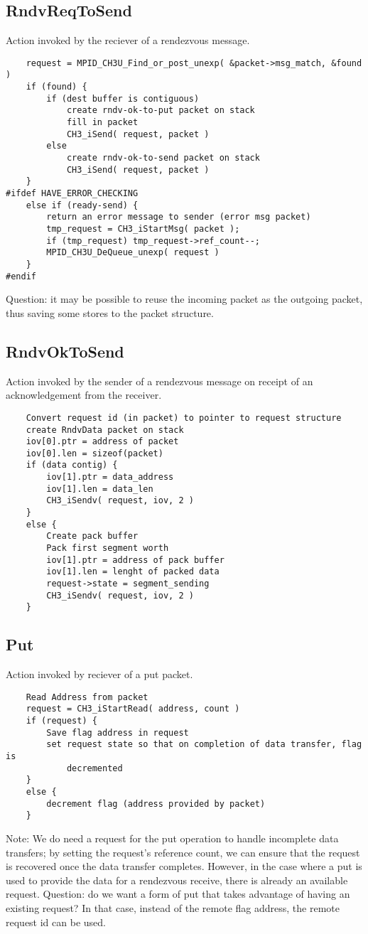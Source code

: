 \documentclass{article}
\begin{document}
\subsection{RndvReqToSend}
Action invoked by the reciever of a rendezvous message.
\begin{verbatim}
    request = MPID_CH3U_Find_or_post_unexp( &packet->msg_match, &found )
    if (found) {
        if (dest buffer is contiguous)
            create rndv-ok-to-put packet on stack
            fill in packet
            CH3_iSend( request, packet )
        else
            create rndv-ok-to-send packet on stack
            CH3_iSend( request, packet )
    }
#ifdef HAVE_ERROR_CHECKING
    else if (ready-send) {
        return an error message to sender (error msg packet)
        tmp_request = CH3_iStartMsg( packet );
        if (tmp_request) tmp_request->ref_count--;
        MPID_CH3U_DeQueue_unexp( request )
    }
#endif
\end{verbatim}
Question: it may be possible to reuse the incoming packet as the
outgoing packet, thus saving some stores to the packet structure.

\subsection{RndvOkToSend}
Action invoked by the sender of a rendezvous message on receipt of an
acknowledgement from the receiver.
\begin{verbatim}
    Convert request id (in packet) to pointer to request structure
    create RndvData packet on stack
    iov[0].ptr = address of packet
    iov[0].len = sizeof(packet)
    if (data contig) {
        iov[1].ptr = data_address
        iov[1].len = data_len
        CH3_iSendv( request, iov, 2 )
    }
    else {
        Create pack buffer
        Pack first segment worth
        iov[1].ptr = address of pack buffer
        iov[1].len = lenght of packed data
        request->state = segment_sending
        CH3_iSendv( request, iov, 2 )
    }
\end{verbatim}

\subsection{Put}
Action invoked by reciever of a put packet.  
\begin{verbatim}
    Read Address from packet
    request = CH3_iStartRead( address, count )
    if (request) {
        Save flag address in request
        set request state so that on completion of data transfer, flag is
            decremented
    }
    else {
        decrement flag (address provided by packet)
    }
\end{verbatim}
Note: We do need a request for the put operation to handle incomplete
data transfers; by setting the 
request's reference count, we can ensure that the request is recovered once
the data transfer completes.  However, in the case where a put is used to
provide the data for a rendezvous receive, there is already an available
request.  Question: do we want a form of put that takes advantage of having an
existing request?  In that case, instead of the remote flag address, the
remote request id can be used.
\end{document}
